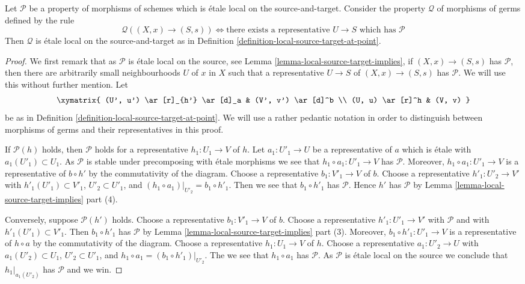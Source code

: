 \begin{lemma}
\label{lemma-local-source-target-global-implies-local}
Let $\mathcal{P}$ be a property of morphisms of schemes
which is \'etale local on the source-and-target.
Consider the property $\mathcal{Q}$ of
morphisms of germs defined by the rule
$$
\mathcal{Q}((X, x) \to (S, s))
\Leftrightarrow
\text{there exists a representative }U \to S
\text{ which has }\mathcal{P}
$$
Then $\mathcal{Q}$ is \'etale local on the source-and-target as in
Definition \ref{definition-local-source-target-at-point}.
\end{lemma}

\begin{proof}
We first remark that as $\mathcal{P}$ is \'etale local on the source, see
Lemma \ref{lemma-local-source-target-implies},
if $(X, x) \to (S, s)$ has $\mathcal{P}$, then there are arbitrarily
small neighbourhoods $U$ of $x$ in $X$ such that a representative
$U \to S$ of $(X, x) \to (S, s)$ has $\mathcal{P}$. We will use this
without further mention. Let
$$
\xymatrix{
(U', u') \ar[r]_{h'} \ar[d]_a & (V', v') \ar[d]^b \\
(U, u) \ar[r]^h & (V, v)
}
$$
be as in
Definition \ref{definition-local-source-target-at-point}.
We will use a rather pedantic notation in order to distinguish
between morphisms of germs and their representatives in this proof.

\medskip\noindent
If $\mathcal{P}(h)$ holds, then $\mathcal{P}$ holds for a representative
$h_1 : U_1 \to V$ of $h$. Let $a_1 : U'_1 \to U$ be a representative of $a$
which is \'etale with $a_1(U'_1) \subset U_1$. As $\mathcal{P}$ is stable under
precomposing with \'etale morphisms we see that $h_1 \circ a_1 : U'_1 \to V$
has $\mathcal{P}$. Moreover, $h_1 \circ a_1 : U'_1 \to V$ is a representative
of $b \circ h'$ by the commutativity of the diagram.
Choose a representative $b_1 : V'_1 \to V$ of $b$.
Choose a representative $h'_1 : U'_2 \to V'$ with
$h'_1(U'_1) \subset V'_1$, $U'_2 \subset U'_1$, and
$(h_1 \circ a_1)|_{U'_2} = b_1 \circ h'_1$.
Then we see that $b_1 \circ h'_1$ has $\mathcal{P}$. Hence
$h'$ has $\mathcal{P}$ by
Lemma \ref{lemma-local-source-target-implies} part (4).

\medskip\noindent
Conversely, suppose $\mathcal{P}(h')$ holds.
Choose a representative $b_1 : V'_1 \to V$ of $b$.
Choose a representative $h'_1 : U'_1 \to V'$ with $\mathcal{P}$
and with $h'_1(U'_1) \subset V'_1$. Then $b_1 \circ h'_1$ has
$\mathcal{P}$ by
Lemma \ref{lemma-local-source-target-implies} part (3).
Moreover, $b_1 \circ h'_1 : U'_1 \to V$ is a representative
of $h \circ a$ by the commutativity of the diagram.
Choose a representative $h_1 : U_1 \to V$ of $h$.
Choose a representative $a_1 : U'_2 \to U$ with
$a_1(U'_2) \subset U_1$, $U'_2 \subset U'_1$, and
$h_1 \circ a_1 = (b_1 \circ h'_1)|_{U'_2}$.
The we see that $h_1 \circ a_1$ has $\mathcal{P}$.
As $\mathcal{P}$ is \'etale local on the source we conclude that
$h_1|_{a_1(U'_2)}$ has $\mathcal{P}$ and we win.
\end{proof}

